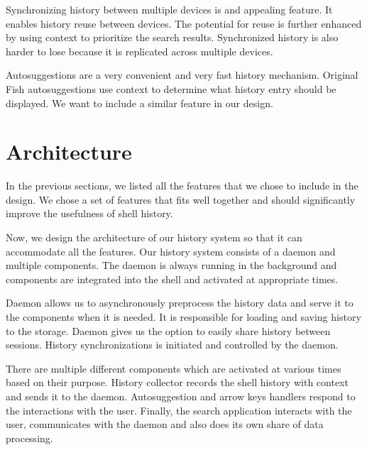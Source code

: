 Synchronizing history between multiple devices is and appealing feature. It enables history reuse between devices. The potential for reuse is further enhanced by using context to prioritize the search results.
Synchronized history is also harder to lose because it is replicated across multiple devices. 


Autosuggestions are a very convenient and very fast history mechanism. Original Fish autosuggestions use context to determine what history entry should be displayed.
We want to include a similar feature in our design.

\newpage
\section{Architecture}

In the previous sections, we listed all the features that we chose to include in the design. We chose a set of features that fits well together and should significantly improve the usefulness of shell history.

Now, we design the architecture of our history system so that it can accommodate all the features. 
Our history system consists of a daemon and multiple components. The daemon is always running in the background and components are integrated into the shell and activated at appropriate times. 


Daemon allows us to asynchronously preprocess the history data and serve it to the components when it is needed. It is responsible for loading and saving history to the storage. Daemon gives us the option to easily share history between sessions. History synchronizations is initiated and controlled by the daemon.


There are multiple different components which are activated at various times based on their purpose. History collector records the shell history with context and sends it to the daemon. Autosuggestion and arrow keys handlers respond to the interactions with the user. Finally, the search application interacts with the user, communicates with the daemon and also does its own share of data processing.


